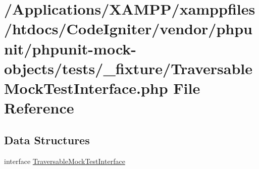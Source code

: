 \hypertarget{_traversable_mock_test_interface_8php}{}\section{/\+Applications/\+X\+A\+M\+P\+P/xamppfiles/htdocs/\+Code\+Igniter/vendor/phpunit/phpunit-\/mock-\/objects/tests/\+\_\+fixture/\+Traversable\+Mock\+Test\+Interface.php File Reference}
\label{_traversable_mock_test_interface_8php}
\subsection*{Data Structures}
\begin{DoxyCompactItemize}
\item 
interface \mbox{\hyperlink{interface_traversable_mock_test_interface}{Traversable\+Mock\+Test\+Interface}}
\end{DoxyCompactItemize}
